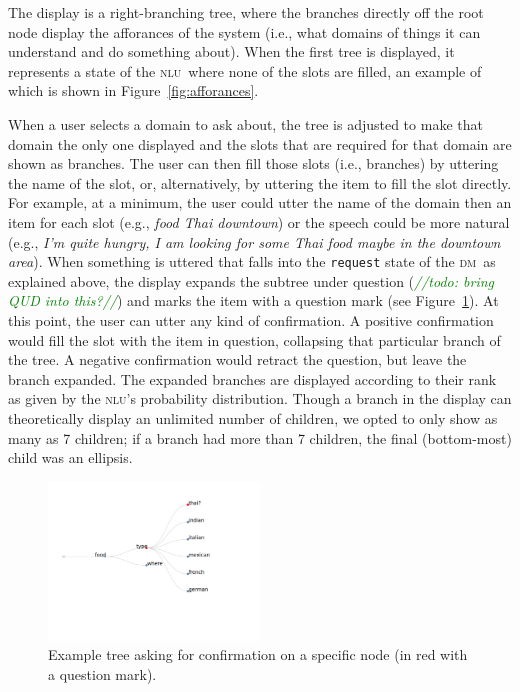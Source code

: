 \documentclass[11pt]{article}
\newcommand{\todo}[1]{\textcolor{green}{\emph{//todo: #1//}}}
\newcommand{\nlu}[0]{\textsc{nlu}}
\newcommand{\dm}[0]{\textsc{dm}}
\begin{document}
The display is a right-branching tree, where the branches directly off the root node display the afforances of the system (i.e., what domains of things it can understand and do something about). When the first tree is displayed, it represents a state of the \nlu\ where none of the slots are filled, an example of which is shown in Figure~\ref{fig:afforances}. 

When a user selects a domain to ask about, the tree is adjusted to make that domain the only one displayed and the slots that are required for that domain are shown as branches. The user can then fill those slots (i.e., branches) by uttering the name of the slot, or, alternatively, by uttering the item to fill the slot directly. For example, at a minimum, the user could utter the name of the domain then an item for each slot (e.g.,  \emph{food Thai downtown}) or the speech could be more natural (e.g., \emph{I'm quite hungry, I am looking for some Thai food maybe in the downtown area}). When something is uttered that falls into the \texttt{request} state of the \dm\ as explained above, the display expands the subtree under question (\todo{bring QUD into this?}) and marks the item with a question mark (see Figure~\ref{fig:confirm}). At this point, the user can utter any kind of confirmation. A positive confirmation would fill the slot with the item in question, collapsing that particular branch of the tree. A negative confirmation would retract the question, but leave the branch expanded. The expanded branches are displayed according to their rank as given by the \nlu's probability distribution. Though a branch in the display can theoretically display an unlimited number of children, we opted to only show as many as 7 children; if a branch had more than 7 children, the final (bottom-most) child was an ellipsis. 

\begin{figure}[ht]
  \centering
      \includegraphics[width=0.5\textwidth]{figures/diatree-confirmation.pdf}	
      \caption{Example tree asking for confirmation on a specific node (in red with a question mark).\label{fig:confirm}}
\end{figure}
\end{document}

